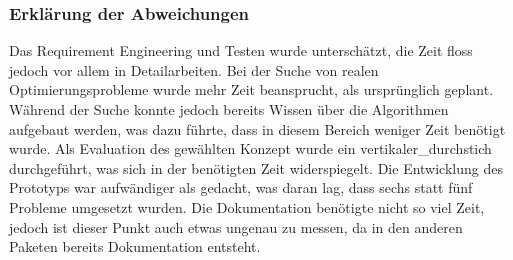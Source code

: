 \subsubsection{Erklärung der Abweichungen}
Das Requirement Engineering und Testen wurde unterschätzt, die Zeit floss jedoch vor allem in Detailarbeiten. Bei der Suche von realen Optimierungsprobleme wurde mehr Zeit beansprucht, als
ursprünglich geplant. Während der Suche konnte jedoch bereits Wissen über die Algorithmen aufgebaut werden, was dazu führte, dass in diesem Bereich weniger Zeit benötigt wurde. Als 
Evaluation des gewählten Konzept wurde ein \gls{vertikaler_durchstich} durchgeführt, was sich in der benötigten Zeit widerspiegelt. Die Entwicklung des Prototyps war aufwändiger 
als gedacht, was daran lag, dass sechs statt fünf Probleme umgesetzt wurden. Die Dokumentation benötigte nicht so viel Zeit, jedoch ist dieser Punkt auch etwas ungenau zu 
messen, da in den anderen Paketen bereits Dokumentation entsteht.
